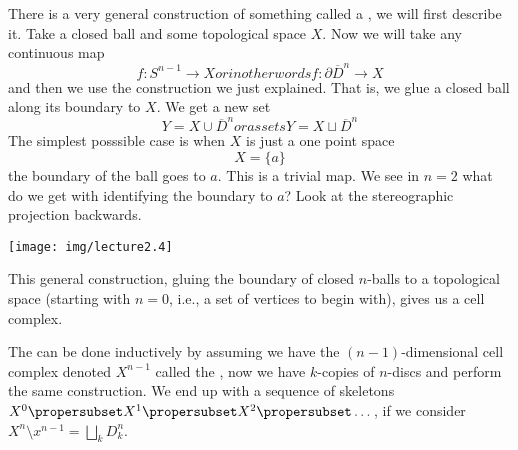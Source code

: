 There is a very general construction of something called a
, we will first describe it. Take a closed
ball and some topological space $X$. Now we will take any
continuous map
\begin{subequations}
\begin{equation}
f\colon S^{n-1}\to X
\end{equation}
or in other words
\begin{equation}
f\colon\partial\overline{D}^{n}\to X
\end{equation}
\end{subequations}
and then we use the construction we just explained. That is, we
glue a closed ball along its boundary to $X$. We get a new set
\begin{subequations}
\begin{equation}
Y=X\cup\overline{D}^{n}
\end{equation}
or as sets
\begin{equation}
Y=X\sqcup\overline{D}^{n}
\end{equation}
\end{subequations}
The simplest posssible case is when $X$ is just a one point space
\begin{equation}
X=\{a\}
\end{equation}
the boundary of the ball goes to $a$. This is a trivial map.
We see in $n=2$ what do we get with identifying the boundary to
$a$? Look at the stereographic projection backwards.
\begin{center}
\texttt{[image: img/lecture2.4]}
\end{center}
This general construction, gluing the boundary of closed
$n$-balls to a topological space (starting with $n=0$, i.e., a
set of vertices to begin with), gives us a cell complex.

\begin{defn}
The  can be done inductively
by assuming we have the $(n-1)$-dimensional cell complex denoted
$X^{n-1}$ called the , now we have
$k$-copies of $n$-discs and perform the same construction. We end
up with a sequence of skeletons $X^{0}\propersubset
X^{1}\propersubset X^{2}\propersubset\dots$, if we consider
$X^{n}\setminus x^{n-1}=\bigsqcup_{k} D^{n}_{k}$.
\end{defn}
